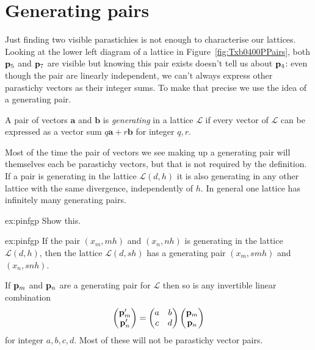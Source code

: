 \section{Generating pairs}
Just finding two visible parastichies is not enough to characterise our lattices.  Looking at the lower left diagram of a lattice in Figure~\ref{fig:Txb0400PPairs}, both ${\mathbf p}_{5}$ and ${\mathbf p}_{7}$ are visible but knowing this pair exists doesn't tell us about ${\mathbf p}_{4}$: even though the pair  are linearly independent, we can't always express other parastichy vectors as their integer sums.  To make that precise we use the idea of a generating pair. 
\begin{definition} A pair of vectors $\mathbf{a}$ and $\mathbf{b}$
		   is \emph{generating} in a lattice $\mathcal{L}$ if every vector of $\mathcal{L}$ can be expressed as a vector sum $q\mathbf{a}+r\mathbf{b}$
		   for integer $q,r$.
\label{def:g}
\end{definition}
 Most of the time the pair of vectors we see making up a generating pair will themselves each be parastichy vectors, but that is not required by the definition. If a pair is generating in the lattice $\mathcal{L}(d,h)$ it is also generating in any other lattice with the same divergence, independently of $h$. In general one lattice has infinitely many generating pairs. 
\begin{jExercise}{ex:pinfgp}
	Show this.
\end{jExercise}
\begin{jAnswer}{ex:pinfgp}
	If the pair $(x_m, m h)$ and $(x_n,n h)$ is generating in the lattice $\mathcal{L}(d,h)$, then the lattice  $\mathcal{L}(d, s h )$ has a generating pair $(x_m, s m h)$ and $(x_n,s n h)$.
	
	If ${\mathbf p}_{m}$ and ${\mathbf p}_{n}$ are a generating pair for $\mathcal{L}$ then so is any invertible linear combination
	\begin{equation}
		\begin{pmatrix}
		{\mathbf p}_{m}' \\ {\mathbf p}_{n}' 
		\end{pmatrix}= 
	\begin{pmatrix}
		a & b  \\ c & d  
	\end{pmatrix}	\begin{pmatrix}
	{\mathbf p}_{m} \\ {\mathbf p}_{n} 
\end{pmatrix}
	\end{equation}
	for integer $a,b,c,d$. Most of these will not be parastichy vector pairs.
\end{jAnswer}

